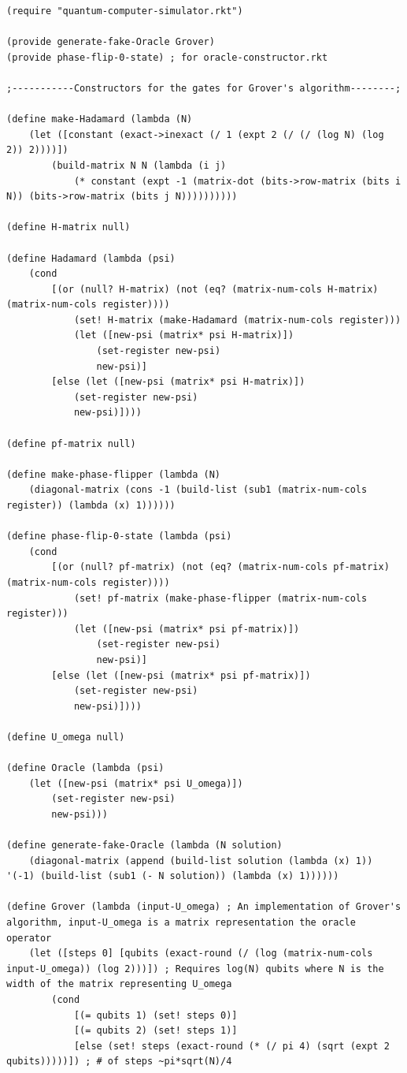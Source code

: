 \documentclass[11pt]{report}
\newcommand{\?}{\stackrel{?}{=}}
\begin{document}
\begin{appendix}
\begin{verbatim}
(require "quantum-computer-simulator.rkt")

(provide generate-fake-Oracle Grover)
(provide phase-flip-0-state) ; for oracle-constructor.rkt

;-----------Constructors for the gates for Grover's algorithm--------;

(define make-Hadamard (lambda (N)
	(let ([constant (exact->inexact (/ 1 (expt 2 (/ (/ (log N) (log 2)) 2))))])
		(build-matrix N N (lambda (i j)
			(* constant (expt -1 (matrix-dot (bits->row-matrix (bits i N)) (bits->row-matrix (bits j N))))))))))

(define H-matrix null)

(define Hadamard (lambda (psi)
	(cond
		[(or (null? H-matrix) (not (eq? (matrix-num-cols H-matrix) (matrix-num-cols register))))
			(set! H-matrix (make-Hadamard (matrix-num-cols register)))
			(let ([new-psi (matrix* psi H-matrix)])
				(set-register new-psi)
				new-psi)]
		[else (let ([new-psi (matrix* psi H-matrix)])
			(set-register new-psi)
			new-psi)])))

(define pf-matrix null)

(define make-phase-flipper (lambda (N)
	(diagonal-matrix (cons -1 (build-list (sub1 (matrix-num-cols register)) (lambda (x) 1))))))

(define phase-flip-0-state (lambda (psi)
	(cond
		[(or (null? pf-matrix) (not (eq? (matrix-num-cols pf-matrix) (matrix-num-cols register))))
			(set! pf-matrix (make-phase-flipper (matrix-num-cols register)))
			(let ([new-psi (matrix* psi pf-matrix)])
				(set-register new-psi)
				new-psi)]
		[else (let ([new-psi (matrix* psi pf-matrix)])
			(set-register new-psi)
			new-psi)])))

(define U_omega null)

(define Oracle (lambda (psi)
	(let ([new-psi (matrix* psi U_omega)])
		(set-register new-psi)
		new-psi)))

(define generate-fake-Oracle (lambda (N solution)
	(diagonal-matrix (append (build-list solution (lambda (x) 1)) '(-1) (build-list (sub1 (- N solution)) (lambda (x) 1))))))

(define Grover (lambda (input-U_omega) ; An implementation of Grover's algorithm, input-U_omega is a matrix representation the oracle operator
	(let ([steps 0] [qubits (exact-round (/ (log (matrix-num-cols input-U_omega)) (log 2)))]) ; Requires log(N) qubits where N is the width of the matrix representing U_omega
		(cond
			[(= qubits 1) (set! steps 0)]
			[(= qubits 2) (set! steps 1)]
			[else (set! steps (exact-round (* (/ pi 4) (sqrt (expt 2 qubits)))))]) ; # of steps ~pi*sqrt(N)/4


\end{verbatim}
\end{appendix}
\end{document}
